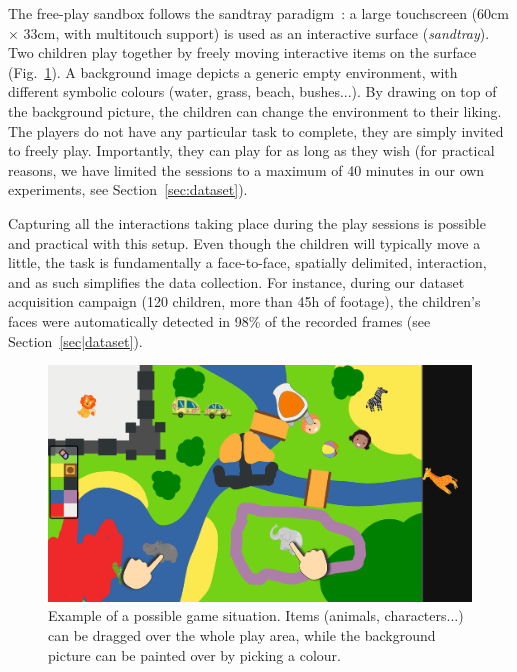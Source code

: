 \documentclass[sigconf]{acmart}
\begin{document}
The free-play sandbox follows the sandtray
paradigm~\cite{baxter2012touchscreen}: a large touchscreen (60cm $\times$ 33cm,
with multitouch support) is used as an interactive surface (\emph{sandtray}).
Two children play together by freely moving interactive items on the surface
(Fig.~\ref{fig|sandbox}). A background image depicts a generic empty
environment, with different symbolic colours (water, grass, beach, bushes...).
By drawing on top of the background picture, the children can change the
environment to their liking. The players do not have any particular task to
complete, they are simply invited to freely play. Importantly, they can play for
as long as they wish (for practical reasons, we have limited the sessions to a
maximum of 40 minutes in our own experiments, see Section~\ref{sec:dataset}).

Capturing all the interactions taking place during the play sessions is possible
and practical with this setup. Even though the children will typically move a
little, the task is fundamentally a face-to-face, spatially delimited,
interaction, and as such simplifies the data collection. For instance, during
our dataset acquisition campaign (120 children, more than 45h of footage), the
children's faces were automatically detected in 98\% of the recorded frames (see
Section~\ref{sec|dataset}).



\begin{figure}[ht!]
    \centering
    \includegraphics[width=0.9\columnwidth]{sandbox}
    \caption{Example of a possible game situation. Items (animals,
    characters...) can be dragged over the whole play area, while the background
    picture can be painted over by picking a colour.}

    \label{fig|sandbox}
\end{figure}

%
\end{document}
